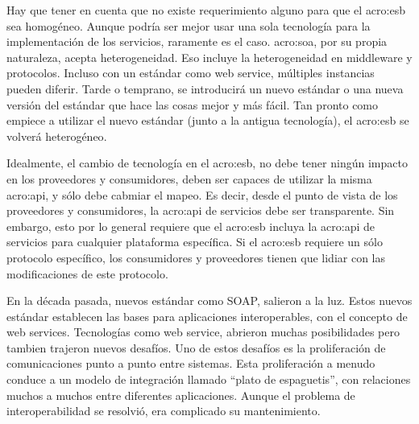 Hay que tener en cuenta que no existe requerimiento alguno para que el \gls{acro:esb} sea homogéneo.  Aunque podría ser mejor usar una sola tecnología para la implementación de los servicios, raramente es el caso. \gls{acro:soa}, por su propia naturaleza, acepta heterogeneidad. Eso incluye la heterogeneidad en middleware y protocolos. Incluso con un estándar como web service, múltiples instancias pueden diferir.  Tarde o temprano, se introducirá un nuevo estándar o una nueva versión del estándar que hace las cosas mejor y más fácil. Tan pronto como empiece a utilizar el nuevo estándar (junto a la antigua tecnología), el \gls{acro:esb} se volverá heterogéneo\cite[p.~49]{josuttis2007}.

Idealmente, el cambio de tecnología en el \gls{acro:esb}, no debe tener ningún impacto en los proveedores y consumidores, deben ser capaces de utilizar la misma \gls{acro:api}, y sólo debe cabmiar el mapeo.
Es decir, desde el punto de vista de los proveedores y consumidores, la \gls{acro:api} de servicios debe ser transparente. Sin embargo, esto por lo general requiere que el \gls{acro:esb} incluya la \gls{acro:api} de servicios para cualquier plataforma específica. Si el \gls{acro:esb} requiere un sólo protocolo específico, los consumidores y proveedores tienen que lidiar con las modificaciones de este protocolo\cite[p.~50]{josuttis2007}.


En la década pasada, nuevos estándar como SOAP, salieron a la luz.  Estos nuevos estándar establecen las bases para aplicaciones interoperables, con el concepto de web services.
Tecnologías como web service, abrieron muchas posibilidades pero tambien trajeron nuevos desafíos.  Uno de estos desafíos es la proliferación de comunicaciones punto a punto entre sistemas.  Esta proliferación a menudo conduce a un modelo de integración llamado ``plato de espaguetis'', con relaciones muchos a muchos entre diferentes aplicaciones.
Aunque el problema de interoperabilidad se resolvió, era complicado su mantenimiento\cite[p.~4]{dossotandemic2010}.

